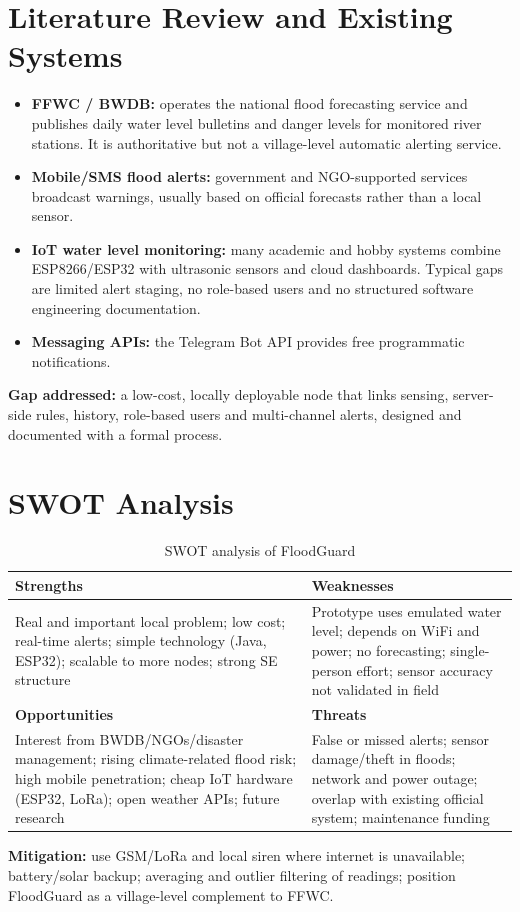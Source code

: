 \documentclass[12pt,a4paper]{article}
\begin{document}
\section{Literature Review and Existing Systems}
\begin{itemize}[noitemsep]
\item \textbf{FFWC / BWDB:} operates the national flood forecasting service and publishes daily water level bulletins and danger levels for monitored river stations. It is authoritative but not a village-level automatic alerting service.
\item \textbf{Mobile/SMS flood alerts:} government and NGO-supported services broadcast warnings, usually based on official forecasts rather than a local sensor.
\item \textbf{IoT water level monitoring:} many academic and hobby systems combine ESP8266/ESP32 with ultrasonic sensors and cloud dashboards. Typical gaps are limited alert staging, no role-based users and no structured software engineering documentation.
\item \textbf{Messaging APIs:} the Telegram Bot API provides free programmatic notifications.
\end{itemize}
\textbf{Gap addressed:} a low-cost, locally deployable node that links sensing, server-side rules, history, role-based users and multi-channel alerts, designed and documented with a formal process.

\section{SWOT Analysis}
\begin{table}[H]\centering\small
\begin{tabular}{p{}p{}}
\toprule
\textbf{Strengths} & \textbf{Weaknesses}\\\midrule
Real and important local problem; low cost; real-time alerts; simple technology (Java, ESP32); scalable to more nodes; strong SE structure &
Prototype uses emulated water level; depends on WiFi and power; no forecasting; single-person effort; sensor accuracy not validated in field\\\midrule
\textbf{Opportunities} & \textbf{Threats}\\\midrule
Interest from BWDB/NGOs/disaster management; rising climate-related flood risk; high mobile penetration; cheap IoT hardware (ESP32, LoRa); open weather APIs; future research &
False or missed alerts; sensor damage/theft in floods; network and power outage; overlap with existing official system; maintenance funding\\\bottomrule
\end{tabular}
\caption{SWOT analysis of FloodGuard}
\end{table}
\noindent\textbf{Mitigation:} use GSM/LoRa and local siren where internet is unavailable; battery/solar backup; averaging and outlier filtering of readings; position FloodGuard as a village-level complement to FFWC.
\end{document}

